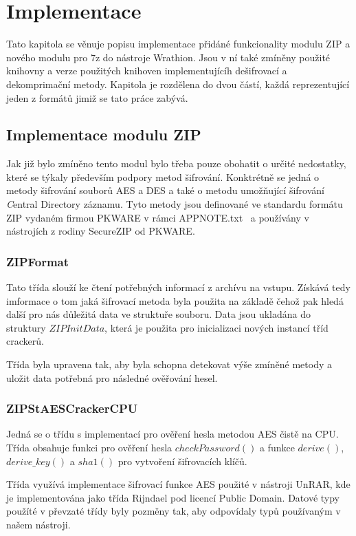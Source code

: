 \chapter{Implementace}
\label{ch:implementace}
Tato kapitola se věnuje popisu implementace přidáné funkcionality modulu ZIP a nového modulu pro
7z do nástroje Wrathion. Jsou v ní také zmíněny použité knihovny a verze použitých knihoven
implementujícíh dešifrovací a dekomprimační metody. Kapitola je rozdělena do dvou částí, každá
reprezentující jeden z formátů jimiž se tato práce zabývá.

\section{Implementace modulu ZIP}
Jak již bylo zmíněno tento modul bylo třeba pouze obohatit o určité nedostatky, které se týkaly
především podpory metod šifrování. Konktrétně se jedná o metody šifrování souborů AES a DES a také
o metodu umožňující šifrování {\textit Central Directory} záznamu. Tyto metody jsou definované ve
standardu formátu ZIP vydaném firmou PKWARE v rámci APPNOTE.txt~\cite{PKWARE:2014} a používány v
nástrojích z rodiny SecureZIP od PKWARE.

\subsection{ZIPFormat}
Tato třída slouží ke čtení potřebných informací z archívu na vstupu. Získává tedy imformace o tom
jaká šifrovací metoda byla použita na základě čehož pak hledá další pro nás důležitá data ve
struktuře souboru. Data jsou ukladána do struktury $ZIPInitData$, která je použita pro
inicializaci nových instancí tříd crackerů. 

 Třída byla upravena tak, aby byla schopna detekovat výše zmíněné metody a uložit data potřebná pro
následné ověřování hesel.

\subsection{ZIPStAESCrackerCPU}
Jedná se o třídu s implementací pro ověření hesla metodou AES čistě na CPU. Třída obsahuje funkci
pro ověření hesla $checkPassword()$ a funkce $derive()$, $derive\_key()$ a $sha1()$ pro vytvoření
šifrovacích klíčů.

 Třída využívá implementace šifrovací funkce AES použité v nástroji UnRAR, kde je
implementována jako třída Rijndael pod licencí Public Domain. Datové typy použíté v převzaté
třídy byly pozměny tak, aby odpovídaly typů používaným v našem nástroji.
 
